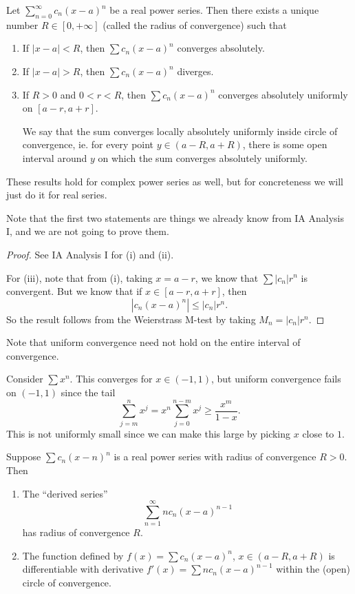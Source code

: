 \documentclass[a4paper]{article}
\begin{document}
\begin{thm}
  Let $\sum\limits_{n = 0}^\infty c_n (x - a)^n$ be a real power series. Then there exists a unique number $R\in [0, +\infty]$ (called the radius of convergence) such that
  \begin{enumerate}
    \item If $|x - a| < R$, then $\sum c_n (x - a)^n$ converges absolutely.
    \item If $|x - a| > R$, then $\sum c_n (x - a)^n$ diverges.
    \item If $R > 0$ and $0 < r < R$, then $\sum c_n (x - a)^n$ converges absolutely uniformly on $[a - r, a + r]$.

      We say that the sum converges locally absolutely uniformly inside circle of convergence, ie. for every point $y\in (a - R, a + R)$, there is some open interval around $y$ on which the sum converges absolutely uniformly.
  \end{enumerate}
  These results hold for complex power series as well, but for concreteness we will just do it for real series.
\end{thm}
Note that the first two statements are things we already know from IA Analysis I, and we are not going to prove them.
\begin{proof}
  See IA Analysis I for (i) and (ii).

  For (iii), note that from (i), taking $x = a - r$, we know that $\sum |c_n| r^n$ is convergent. But we know that if $x\in [a - r, a + r]$, then
  \[
    |c_n (x - a)^n| \leq |c_n| r^n.
  \]
  So the result follows from the Weierstrass M-test by taking $M_n = |c_n| r^n$.
\end{proof}
Note that uniform convergence need not hold on the entire interval of convergence.
\begin{eg}
  Consider $\sum x^n$. This converges for $x\in (-1, 1)$, but uniform convergence fails on $(-1, 1)$ since the tail
  \[
    \sum_{j = m}^n x^j = x^n \sum_{j = 0}^{n - m} x^j \geq \frac{x^m}{1 - x}.
  \]
  This is not uniformly small since we can make this large by picking $x$ close to $1$.
\end{eg}

\begin{thm}
  Suppose $\sum c_n (x - n)^n$ is a real power series with radius of convergence $R > 0$. Then
  \begin{enumerate}
    \item The ``derived series''
      \[
        \sum_{n = 1}^\infty n c_n (x - a)^{n - 1}
      \]
      has radius of convergence $R$.
    \item The function defined by $f(x) = \sum c_n (x - a)^n$, $x\in (a - R, a + R)$ is differentiable with derivative $f'(x) = \sum n c_n (x - a)^{n - 1}$ within the (open) circle of convergence.
  \end{enumerate}
\end{thm}
\end{document}
